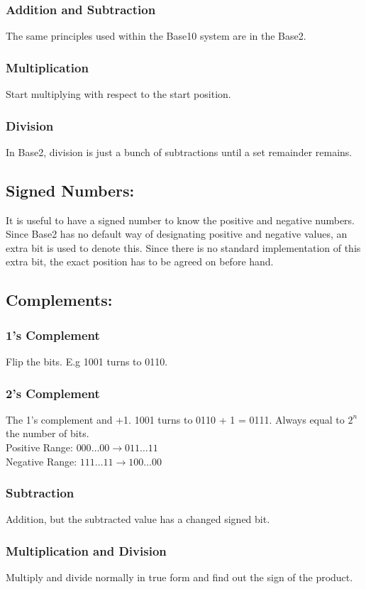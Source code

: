 \documentclass[a5paper]{article}
\begin{document}
	\subsubsection{Addition and Subtraction}
	The same principles used within the Base10 system are in the Base2.
	\subsubsection{Multiplication}
	Start multiplying with respect to the start position.
	\subsubsection{Division}
	In Base2, division is just a bunch of subtractions until a set remainder remains.

	\subsection{Signed Numbers:}
	It is useful to have a signed number to know the positive and negative numbers. Since Base2 has no default way of designating positive and negative values, an extra bit is used to denote this. Since there is no standard implementation of this extra bit, the exact position has to be agreed on before hand.

	\subsection{Complements:}
	\subsubsection{1's Complement}
	Flip the bits. E.g 1001 turns to 0110.
	\subsubsection{2's Complement}
	The 1's complement and +1. 1001 turns to 0110 + 1 = 0111. Always equal to $2^{n}$ the number of bits.\\
	Positive Range: $000\ldots00\rightarrow011\ldots11$\\
	Negative Range: $111\ldots11\rightarrow100\ldots00$
	\subsubsection{Subtraction}
	Addition, but the subtracted value has a changed signed bit.
	\subsubsection{Multiplication and Division}
	Multiply and divide normally in true form and find out the sign of the product.
\end{document}

